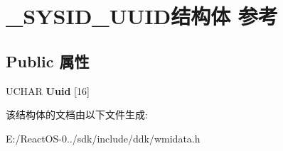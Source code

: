 \hypertarget{struct___s_y_s_i_d___u_u_i_d}{}\section{\+\_\+\+S\+Y\+S\+I\+D\+\_\+\+U\+U\+I\+D结构体 参考}
\label{struct___s_y_s_i_d___u_u_i_d}
\subsection*{Public 属性}
\begin{DoxyCompactItemize}
\item 
\mbox{\label{struct___s_y_s_i_d___u_u_i_d_ae1d7e7b96e820e9f470d65ce3c747131}} 
U\+C\+H\+AR {\bfseries Uuid} \mbox{[}16\mbox{]}
\end{DoxyCompactItemize}


该结构体的文档由以下文件生成\+:\begin{DoxyCompactItemize}
\item 
E\+:/\+React\+O\+S-\/0../sdk/include/ddk/wmidata.\+h\end{DoxyCompactItemize}
